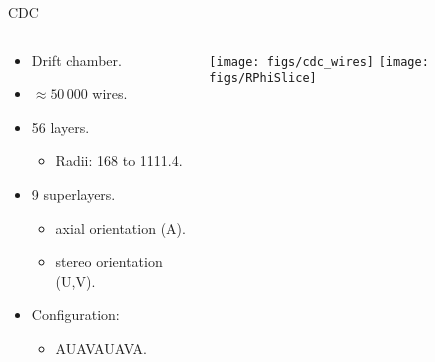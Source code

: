 \begin{frame}{CDC}
\begin{columns}
\begin{column}{0.45\linewidth} 
\begin{itemize} \small
\item Drift chamber.
\vspace{0.25cm}
\item $\approx50\,000$ wires.
\vspace{0.25cm}
\item 56 layers.
\vspace{0.15cm}
\begin{itemize}
\item Radii: 168 to 1111.4\mm.
\vspace{0.25cm}
\end{itemize}
\item 9 superlayers.
\vspace{0.15cm}
\begin{itemize}
\item axial orientation (A).
\vspace{0.15cm}
\item stereo orientation (U,V).
\vspace{0.25cm}
\end{itemize}
\item Configuration:
\vspace{0.15cm}
\begin{itemize}
\item AUAVAUAVA.
\end{itemize}
\end{itemize}
\end{column}
\begin{column}{0.55\linewidth}
\centering
\texttt{[image: figs/cdc\_wires]}
\texttt{[image: figs/RPhiSlice]}
\end{column}
\end{columns}
\end{frame}
